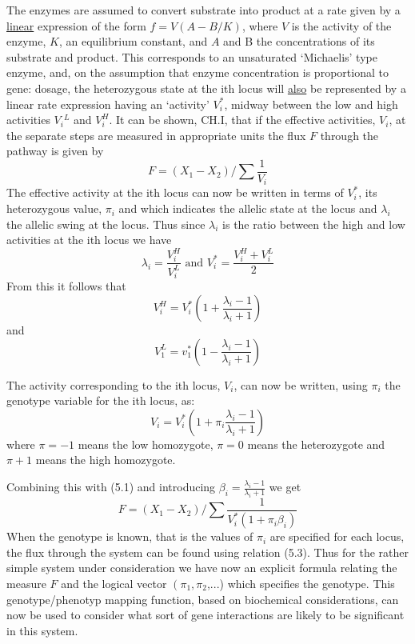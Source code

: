 The enzymes are assumed to convert substrate into product at a rate given by a \underline{linear} expression of the form $f = V(A-B/K)$, where $V$ is the activity of the enzyme, $K$, an equilibrium constant, and $A$ and B the concentrations of its substrate and product. This corresponds to an unsaturated `Michaelis' type enzyme, and, on the assumption that enzyme concentration is proportional to gene: dosage, the heterozygous state at the ith locus will \underline{also} be represented by a linear rate expression having an `activity' $V_{i}^{*}$, midway between the low and high activities $V_{i}{ }^{L}$ and $V_{i}^{H}$. It can be shown, CH.I, that if the effective activities, $V_{i}$, at the separate steps are measured in appropriate units the flux $F$ through the pathway is given by
%
\begin{equation}
F = \left(X_{1}-X_{2}\right) / \sum \frac{1}{V_i}
\label{eqn:501}
\end{equation}
%
The effective activity at the ith locus can now be written in terms of $V_{i}^{*}$, its heterozygous value, $\pi_i$ and which indicates the allelic state at the locus and $\lambda_{i}$ the allelic swing at the locus. Thus since $\lambda_{i}$ is the ratio between the high and low activities at the ith locus we have
%
$$
\lambda_{i}=\frac{V_{i}^{H}}{V_{i}^{L}} \text { and }{V_{i}^{*}} = \frac{{V_{i}^{H}} + V_{i}^{L}}{2}
$$
%
From this it follows that
%
$$ V_i^H = V_i^*\left(1+\frac{\lambda_i-1}{\lambda_i+1}\right) $$
%
and 
%
$$V_{1}^{L}=v_{1}^{*}\left(1 - \frac{\lambda_{i} - 1}{\lambda_{i}+1}\right)$$

The activity corresponding to the ith locus, $V_{i}$, can now be written, using $\pi_{i}$ the genotype variable for the ith locus, as:
%
\begin{equation}
V_{i} = V_{i}^{*}\left(1+\pi_{i} \frac{\lambda_{i}-1}{\lambda_{i}+1}\right)
\label{eqn:502}
\end{equation}
%
where $\pi=-1$ means the low homozygote, $\pi=0$ means the heterozygote and $\pi+1$ means the high homozygote.

Combining this with (5.1) and introducing $\beta_{i}=\frac{\lambda_{i}-1}{\lambda_{i}+1}$ we get 
%
\begin{equation}
F=\left(X_{1}-X_{2}\right) / \sum \frac{1}{V_{i}^{*}\left(1+\pi_{i} \beta_{i}\right)}
\label{eqn:503}
\end{equation}
%
When the genotype is known, that is the values of $\pi_i$ are specified for each locus, the flux through the system can be found using relation (5.3). Thus for the rather simple system under consideration we have now an explicit formula relating the measure $F$ and the logical vector $\left(\pi_{1}, \pi_{2}\right.$,...) which specifies the genotype. This genotype/phenotyp mapping function, based on biochemical considerations, can now be used to consider what sort of gene interactions are likely to be significant in this system.

